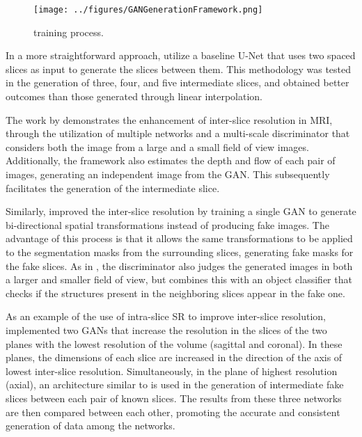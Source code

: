 \begin{figure}[!ht]
	\centering
	\texttt{[image: ../figures/GANGenerationFramework.png]}
	\caption{\textcite{Lopez2023} training process.}
	\label{fig:GANGenerationFramework}
\end{figure}

In a more straightforward approach, \textcite{Nishimoto2024} utilize a baseline U-Net that uses two spaced slices as input to generate the slices between them. This methodology was tested in the generation of three, four, and five intermediate slices, and obtained better outcomes than those generated through linear interpolation.
\par
The work by \textcite{Xia2021} demonstrates the enhancement of inter-slice resolution in MRI, through the utilization of multiple networks and a multi-scale discriminator that considers both the image from a large and a small field of view images. Additionally, the framework also estimates the depth and flow of each pair of images, generating an independent image from the GAN. This subsequently facilitates the generation of the intermediate slice.
\par
Similarly, \textcite{Wu2022} improved the inter-slice resolution by training a single GAN to generate bi-directional spatial transformations instead of producing fake images. The advantage of this process is that it allows the same transformations to be applied to the segmentation masks from the surrounding slices, generating fake masks for the fake slices. As in \textcite{Xia2021}, the discriminator also judges the generated images in both a larger and smaller field of view, but combines this with an object classifier that checks if the structures present in the neighboring slices appear in the fake one.
\par
As an example of the use of intra-slice SR to improve inter-slice resolution, \textcite{Zhang2024} implemented two GANs that increase the resolution in the slices of the two planes with the lowest resolution of the volume (sagittal and coronal). In these planes, the dimensions of each slice are increased in the direction of the axis of lowest inter-slice resolution. Simultaneously, in the plane of highest resolution (axial), an architecture similar to \textcite{Lopez2023} is used in the generation of intermediate fake slices between each pair of known slices. The results from these three networks are then compared between each other, promoting the accurate and consistent generation of data among the networks.
\par
